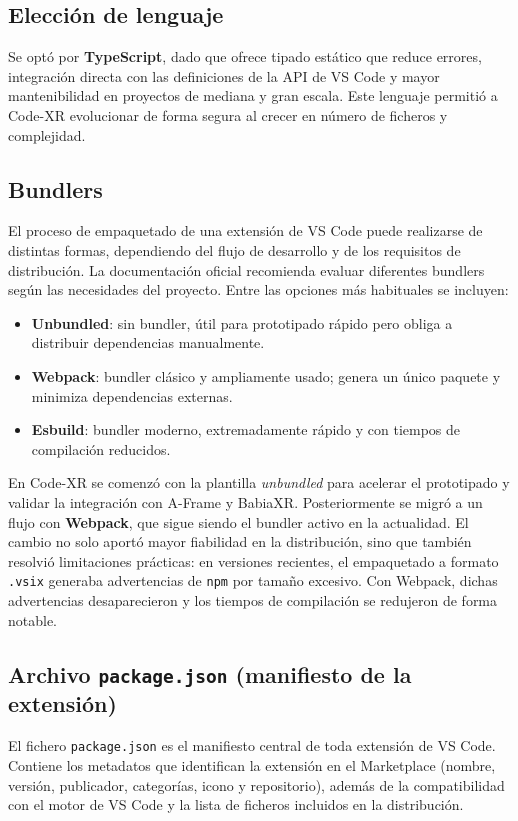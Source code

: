 \documentclass[a4paper, 12pt]{book}
\begin{document}
\subsection{Elección de lenguaje}
Se optó por \textbf{TypeScript}, dado que ofrece tipado estático que reduce errores, integración directa con las definiciones de la API de VS Code y mayor mantenibilidad en proyectos de mediana y gran escala\cite{typescript}. Este lenguaje permitió a Code-XR evolucionar de forma segura al crecer en número de ficheros y complejidad.

\subsection{Bundlers}
El proceso de empaquetado de una extensión de VS Code puede realizarse de distintas formas, dependiendo del flujo de desarrollo y de los requisitos de distribución. La documentación oficial recomienda evaluar diferentes bundlers según las necesidades del proyecto\cite{vscode-bundling}.  
Entre las opciones más habituales se incluyen:
\begin{itemize}
  \item \textbf{Unbundled}: sin bundler, útil para prototipado rápido pero obliga a distribuir dependencias manualmente.
  \item \textbf{Webpack}: bundler clásico y ampliamente usado; genera un único paquete y minimiza dependencias externas\cite{webpack}.
  \item \textbf{Esbuild}: bundler moderno, extremadamente rápido y con tiempos de compilación reducidos\cite{esbuild}.
\end{itemize}

En Code-XR se comenzó con la plantilla \emph{unbundled} para acelerar el prototipado y validar la integración con A-Frame y BabiaXR. Posteriormente se migró a un flujo con \textbf{Webpack}, que sigue siendo el bundler activo en la actualidad. El cambio no solo aportó mayor fiabilidad en la distribución, sino que también resolvió limitaciones prácticas: en versiones recientes, el empaquetado a formato \texttt{.vsix} generaba advertencias de \texttt{npm} por tamaño excesivo. Con Webpack, dichas advertencias desaparecieron y los tiempos de compilación se redujeron de forma notable.

\subsection{Archivo \texttt{package.json} (manifiesto de la extensión)}
El fichero \texttt{package.json} es el manifiesto central de toda extensión de VS Code. Contiene los metadatos que identifican la extensión en el Marketplace (nombre, versión, publicador, categorías, icono y repositorio), además de la compatibilidad con el motor de VS Code y la lista de ficheros incluidos en la distribución.  
\end{document}

